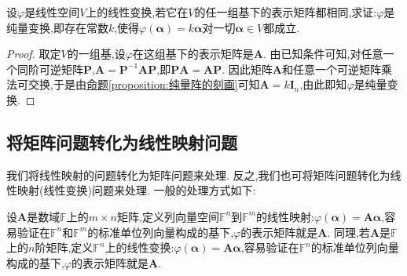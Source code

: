 \documentclass[../../main.tex]{subfiles}%
\begin{document}
\begin{proposition}\label{proposition:任一组基下的表示矩阵都相同的线性变换是纯量变换}
设\(\varphi\)是线性空间\(V\)上的线性变换,若它在\(V\)的任一组基下的表示矩阵都相同,求证:\(\varphi\)是纯量变换,即存在常数\(k\),使得\(\varphi(\boldsymbol{\alpha}) = k\boldsymbol{\alpha}\)对一切\(\boldsymbol{\alpha}\in V\)都成立.
\end{proposition}
\begin{proof}

取定\(V\)的一组基,设\(\varphi\)在这组基下的表示矩阵是\(\boldsymbol{A}\). 由已知条件可知,对任意一个同阶可逆矩阵\(\boldsymbol{P}\),\(\boldsymbol{A}=\boldsymbol{P}^{-1}\boldsymbol{A}\boldsymbol{P}\),即\(\boldsymbol{P}\boldsymbol{A}=\boldsymbol{A}\boldsymbol{P}\). 因此矩阵\(\boldsymbol{A}\)和任意一个可逆矩阵乘法可交换,于是由\hyperref[proposition:纯量阵的刻画]{命题\ref{proposition:纯量阵的刻画}}可知\(\boldsymbol{A}=k\boldsymbol{I}_n\),由此即知\(\varphi\)是纯量变换.

\end{proof}

\subsection{将矩阵问题转化为线性映射问题}
我们将线性映射的问题转化为矩阵问题来处理. 反之,我们也可将矩阵问题转化为线性映射(线性变换)问题来处理. 一般的处理方式如下:

设\(\boldsymbol{A}\)是数域\(\mathbb{F}\)上的\(m\times n\)矩阵,定义列向量空间\(\mathbb{F}^n\)到\(\mathbb{F}^m\)的线性映射:\(\varphi(\boldsymbol{\alpha})=\boldsymbol{A}\boldsymbol{\alpha}\),容易验证在\(\mathbb{F}^n\)和\(\mathbb{F}^m\)的标准单位列向量构成的基下,\(\varphi\)的表示矩阵就是\(\boldsymbol{A}\). 同理,若\(\boldsymbol{A}\)是\(\mathbb{F}\)上的\(n\)阶矩阵,定义\(\mathbb{F}^n\)上的线性变换:\(\varphi(\boldsymbol{\alpha})=\boldsymbol{A}\boldsymbol{\alpha}\),容易验证在\(\mathbb{F}^n\)的标准单位列向量构成的基下,\(\varphi\)的表示矩阵就是\(\boldsymbol{A}\). 
\end{document}
